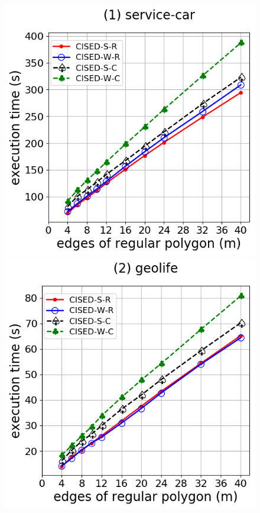 {\begin{figure}[tb!]
	\centering
	\includegraphics[scale = 0.290]{Figures/Exp-M-e-60-time-service.png}\hspace{1ex}
	\includegraphics[scale = 0.290]{Figures/Exp-M-e-60-time-geolife.png}\hspace{1ex}

\end{figure}}
